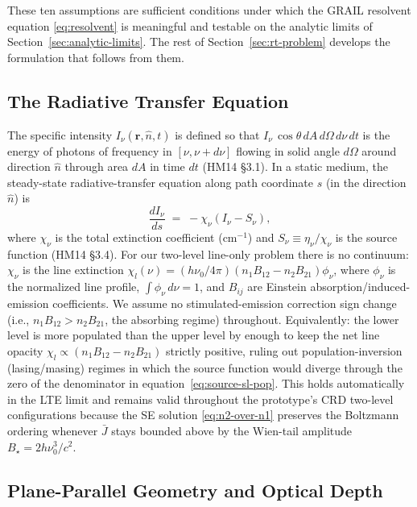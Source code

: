 \documentclass[11pt]{article}
\newcommand{\Jbar}{\bar{J}}
\begin{document}
These ten assumptions are sufficient conditions under which the GRAIL
resolvent equation \eqref{eq:resolvent} is meaningful and testable on
the analytic limits of Section~\ref{sec:analytic-limits}.  The rest of
Section~\ref{sec:rt-problem} develops the formulation that follows
from them.

\subsection{The Radiative Transfer Equation}
\label{sec:rte}

The specific intensity $I_\nu(\mathbf{r}, \hat{n}, t)$ is defined so that
$I_\nu \, \cos\theta\, dA\, d\Omega\, d\nu\, dt$ is the energy of photons of
frequency in $[\nu, \nu+d\nu]$ flowing in solid angle $d\Omega$ around
direction $\hat{n}$ through area $dA$ in time $dt$ (HM14 §3.1). In a static
medium, the steady-state radiative-transfer equation along path coordinate
$s$ (in the direction $\hat{n}$) is
\begin{equation}
\frac{dI_\nu}{ds} \;=\; -\chi_\nu (I_\nu - S_\nu),
\label{eq:rte-general}
\end{equation}
where $\chi_\nu$ is the total extinction coefficient (cm$^{-1}$) and
$S_\nu \equiv \eta_\nu / \chi_\nu$ is the source function (HM14 §3.4). For our
two-level line-only problem there is no continuum: $\chi_\nu$ is the line
extinction $\chi_l(\nu) = (h\nu_0/4\pi)(n_1 B_{12} - n_2 B_{21})\phi_\nu$,
where $\phi_\nu$ is the normalized line profile, $\int \phi_\nu \, d\nu = 1$,
and $B_{ij}$ are Einstein absorption/induced-emission coefficients. We assume
no stimulated-emission correction sign change (i.e., $n_1 B_{12} > n_2 B_{21}$,
the absorbing regime) throughout. Equivalently: the lower level is more
populated than the upper level by enough to keep the net line opacity
$\chi_l \propto (n_1 B_{12} - n_2 B_{21})$ strictly positive, ruling out
population-inversion (lasing/masing) regimes in which the source function
would diverge through the zero of the denominator in
equation~\eqref{eq:source-sl-pop}. This holds automatically in the LTE
limit and remains valid throughout the prototype's CRD two-level
configurations because the SE solution \eqref{eq:n2-over-n1} preserves
the Boltzmann ordering whenever $\Jbar$ stays bounded above by the
Wien-tail amplitude $B_\star = 2 h\nu_0^3/c^2$.

\subsection{Plane-Parallel Geometry and Optical Depth}
\end{document}

